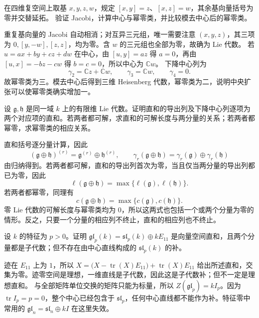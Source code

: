 \begin{exercise}\label{b5:ex:11-central-extension-class}
	在四维复空间上取基 \(x,y,z,w\)，规定 \([x,y]=z\)、\([x,z]=w\)，其余基向量括号为零并交替延拓。 验证 Jacobi，计算中心与幂零类，并比较模去中心后的幂零类。
\end{exercise}
\begin{solution}
	重复基向量的 Jacobi 自动相消；对互异三元组，唯一需要注意 \((x,y,z)\)，其三项为 \(0,[y,-w],[z,z]\)，均为零。含 \(w\) 的三元组也全部为零，故确为 Lie 代数。 若 \(u=ax+by+cz+dw\) 在中心，由 \([u,y]=az\) 得 \(a=0\)，再由 \([u,x]=-bz-cw\) 得 \(b=c=0\)，所以中心为 \(\mathbb Cw\)。 下降中心列为
	\[
		\gamma_2=\mathbb Cz+\mathbb Cw,\qquad \gamma_3=\mathbb Cw,\qquad\gamma_4=0.
	\]
	故幂零类为三。模去中心后得到三维 Heisenberg 代数，幂零类为二，说明中央扩张可以使幂零类确实增加一。
\end{solution}

\begin{exercise}\label{b5:ex:11-direct-sum-series}
	设 \(\mathfrak g,\mathfrak h\) 是同一域 \(k\) 上的有限维 Lie 代数。证明直和的导出列及下降中心列逐项为两个对应项的直和。若两者都可解，求直和的可解长度与两分量的关系；若两者都幂零，求幂零类的相应关系。
\end{exercise}
\begin{solution}
	直和括号逐分量计算，因此
	\[
		(\mathfrak g\oplus\mathfrak h)^{(r)} =\mathfrak g^{(r)}\oplus\mathfrak h^{(r)},\qquad \gamma_r(\mathfrak g\oplus\mathfrak h) =\gamma_r(\mathfrak g)\oplus\gamma_r(\mathfrak h)
	\]
	由归纳得到。若两者都可解，直和的导出列首次为零，当且仅当两分量的导出列都已为零，因此
	\[
		\ell(\mathfrak g\oplus\mathfrak h) =\max\{\ell(\mathfrak g),\ell(\mathfrak h)\}.
	\]
	若两者都幂零，同理有
	\[
		c(\mathfrak g\oplus\mathfrak h) =\max\{c(\mathfrak g),c(\mathfrak h)\}.
	\]
	零 Lie 代数的可解长度与幂零类均为 \(0\)，所以这两式也包括一个或两个分量为零的情形。反之，只要一个分量的相应列不终止，直和的相应列也不终止。
\end{solution}

\begin{exercise}\label{b5:ex:11-modular-central-complement}
	设 \(k\) 的特征为 \(p>0\)。证明 \(\mathfrak{gl}_p(k)=\mathfrak{sl}_p(k)\oplus kE_{11}\) 是向量空间直和，且两个分量都是子代数；但不存在由中心直线构成的 \(\mathfrak{sl}_p(k)\) 的补。
\end{exercise}
\begin{solution}
	迹在 \(E_{11}\) 上为 \(1\)，所以 \(X=\bigl(X-\operatorname{tr}(X)E_{11}\bigr)+\operatorname{tr}(X)E_{11}\) 给出所述直和，交集为零。迹零空间是理想，一维直线是子代数，因此这是子代数补；但不一定是理想直和。 与全部矩阵单位交换的矩阵只能为标量，所以 \(Z(\mathfrak{gl}_p)=kI_p\)。因为 \(\operatorname{tr}I_p=p=0\)，整个中心已经包含于 \(\mathfrak{sl}_p\)，任何中心直线都不能作为补。特征零中常用的 \(\mathfrak{gl}_n=\mathfrak{sl}_n\oplus kI\) 在这里失效。
\end{solution}
